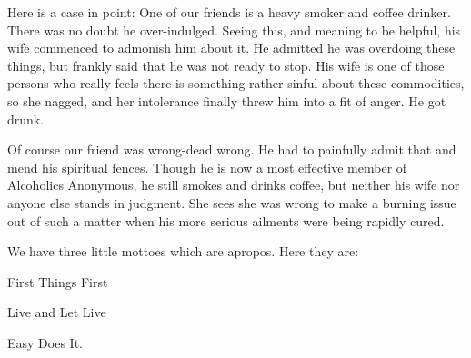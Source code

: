 \begin{biblechapter}
Here is a case in point:  One of our friends is a heavy smoker and coffee drinker.  There was no doubt he over-indulged.  Seeing this, and meaning to be helpful, his wife commenced to admonish him about it.  He admitted he was overdoing these things, but frankly said that he was not ready to stop.  His wife is one of those persons who really feels there is something rather sinful about these commodities, so she nagged, and her intolerance finally threw him into a fit of anger.  He got drunk.

Of course our friend was wrong-dead wrong.  He had to painfully admit that and mend his spiritual fences.  Though he is now a most effective member of Alcoholics Anonymous, he still smokes and drinks coffee, but neither his wife nor anyone else stands in judgment.  She sees she was wrong to make a burning issue out of such a matter when his more serious ailments were being rapidly cured.

We have three little mottoes which are apropos.  Here they are:

First Things First

Live and Let Live

Easy Does It.

\end{biblechapter}

